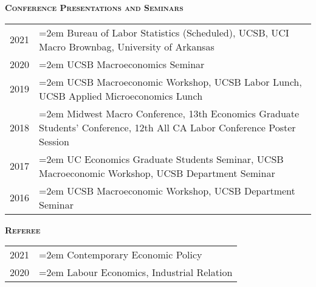 \documentclass[11pt]{article}
\newenvironment{rSection}[1]{ %
  {\large\bf\textsc{#1}}
  \vspace{0.15cm}
  \begin{list}{}{ %
    \setlength{\leftmargin}{1.5em} %
    \setlength{\rightmargin}{1.5em}
  }
  \item[]
}{
  \end{list}
  \vspace{0.15cm}
}
\begin{document}
\begin{rSection}{Conference Presentations and Seminars}
\begin{tabularx}{\linewidth}{l >{\hangindent=2em}X}
2021 & Bureau of Labor Statistics (Scheduled), UCSB, UCI Macro Brownbag, University of Arkansas \\
2020 & UCSB Macroeconomics Seminar\\
2019 & UCSB Macroeconomic Workshop, UCSB Labor Lunch, UCSB Applied Microeconomics Lunch\\
2018 & Midwest Macro Conference, 13th Economics Graduate Students' Conference, 12th All CA Labor Conference Poster Session\\
2017 & UC Economics Graduate Students Seminar, UCSB Macroeconomic Workshop, UCSB Department Seminar\\
2016 & UCSB Macroeconomic Workshop, UCSB Department Seminar\\
\end{tabularx}
\end{rSection}

\begin{rSection}{Referee}
\begin{tabularx}{\linewidth}{l >{\hangindent=2em}X}
2021 & Contemporary Economic Policy\\
2020 & Labour Economics, Industrial Relation
\end{tabularx}
\end{rSection}
\end{document}
